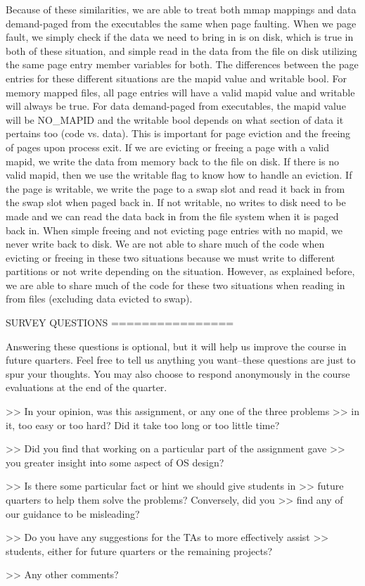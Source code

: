 Because of these similarities, we are able to treat both mmap mappings
and data demand-paged from the executables the same when page faulting.
When we page fault, we simply check if the data we need to bring in is
on disk, which is true in both of these situation, and simple read in
the data from the file on disk utilizing the same page entry member
variables for both. The differences between the page entries for
these different situations are the mapid value and writable bool. For 
memory mapped files, all page entries will have a valid mapid value and
writable will always be true. For data demand-paged from executables, 
the mapid value will be NO_MAPID and the writable bool depends on what
section of data it pertains too (code vs. data). This is important for
page eviction and the freeing of pages upon process exit. If we are 
evicting or freeing a page with a valid mapid, we write the data from
memory back to the file on disk. If there is no valid mapid, then we 
use the writable flag to know how to handle an eviction. If the page is
writable, we write the page to a swap slot and read it back in from the
swap slot when paged back in. If not writable, no writes to disk need to be
made and we can read the data back in from the file system when it is paged
back in. When simple freeing and not evicting page entries with no mapid,
we never write back to disk. We are not able to share much of the code
when evicting or freeing in these two situations because we must write to
different partitions or not write depending on the situation. However,
as explained before, we are able to share much of the code for these two
situations when reading in from files (excluding data evicted to swap).

               SURVEY QUESTIONS
               ================

Answering these questions is optional, but it will help us improve the
course in future quarters.  Feel free to tell us anything you
want--these questions are just to spur your thoughts.  You may also
choose to respond anonymously in the course evaluations at the end of
the quarter.

>> In your opinion, was this assignment, or any one of the three problems
>> in it, too easy or too hard?  Did it take too long or too little time?

>> Did you find that working on a particular part of the assignment gave
>> you greater insight into some aspect of OS design?

>> Is there some particular fact or hint we should give students in
>> future quarters to help them solve the problems?  Conversely, did you
>> find any of our guidance to be misleading?

>> Do you have any suggestions for the TAs to more effectively assist
>> students, either for future quarters or the remaining projects?

>> Any other comments?
